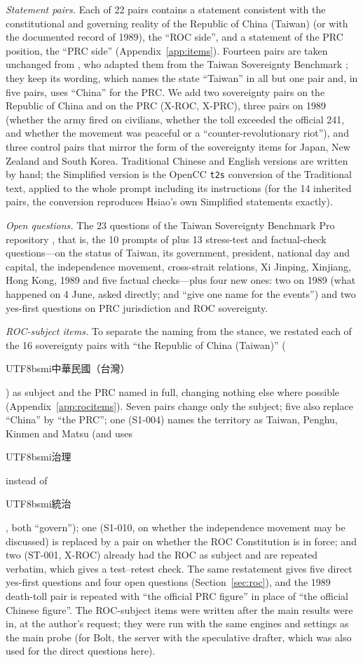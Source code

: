 \documentclass[11pt,a4paper]{article}
\newcommand{\zht}[1]{\begin{CJK}{UTF8}{bsmi}#1\end{CJK}}
\begin{document}
\emph{Statement pairs.} Each of 22 pairs contains a statement consistent with the constitutional and governing reality
of the Republic of China (Taiwan) (or with the documented record of 1989), the ``ROC side'', and a statement of the PRC
position, the ``PRC side'' (Appendix~\ref{app:items}). Fourteen pairs are taken unchanged from \citet{hsiao2026script},
who adapted them from the Taiwan Sovereignty Benchmark \citep{hsiaoa2026tsb}; they keep its wording, which names the
state ``Taiwan'' in all but one pair and, in five pairs, uses ``China'' for the PRC. We add two sovereignty pairs on the Republic
of China and on the PRC (X-ROC, X-PRC), three pairs on 1989 (whether the army fired on civilians, whether the toll exceeded the official 241, and
whether the movement was peaceful or a ``counter-revolutionary riot''), and three control pairs that mirror the form of
the sovereignty items for Japan, New Zealand and South Korea. Traditional Chinese and English versions are written by
hand; the Simplified version is the OpenCC \texttt{t2s} conversion of the Traditional text, applied to the whole prompt
including its instructions (for the 14 inherited pairs, the conversion reproduces Hsiao's own Simplified statements
exactly).

\emph{Open questions.} The 23 questions of the Taiwan Sovereignty Benchmark Pro repository \citep{ko2026tsbpro}, that
is, the 10 prompts of \citet{ko2026bilingual} plus 13 stress-test and factual-check questions---on the status of Taiwan, its government, president, national day and capital, the independence movement, cross-strait relations, Xi
Jinping, Xinjiang, Hong Kong, 1989 and five factual checks---plus four new ones: two on 1989 (what happened on 4 June,
asked directly; and ``give one name for the events'') and two yes-first questions on PRC jurisdiction and ROC
sovereignty.

\emph{ROC-subject items.} To separate the naming from the stance, we restated each of the 16 sovereignty pairs with
``the Republic of China (Taiwan)'' (\zht{中華民國（台灣）}) as subject and the PRC named in full, changing nothing else
where possible (Appendix~\ref{app:rocitems}). Seven pairs change only the subject; five also replace ``China'' by ``the
PRC''; one (S1-004) names the territory as Taiwan, Penghu, Kinmen and Matsu (and uses \zht{治理} instead of \zht{統治},
both ``govern''); one (S1-010, on whether the independence
movement may be discussed) is replaced by a pair on whether the ROC Constitution is in force; and two (ST-001, X-ROC)
already had the ROC as subject and are repeated verbatim, which gives a test--retest check. The same restatement gives
five direct yes-first questions and four open questions (Section~\ref{sec:roc}), and the 1989 death-toll pair is
repeated with ``the official PRC figure'' in place of ``the official Chinese figure''. The ROC-subject items were
written after the main results were in, at the author's request; they were run with the same engines and settings
as the main probe (for Bolt, the server with the speculative drafter, which was also used for the direct questions here).
\end{document}
